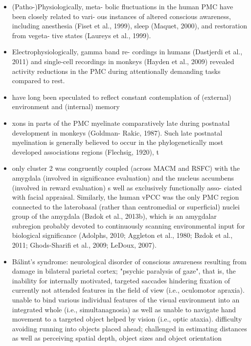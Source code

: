 \documentclass{article} %
\begin{document}
\begin{itemize}
\begin{itemize}
\item
(Patho-)Physiologically, meta- bolic fluctuations in the human PMC have been closely related to vari- ous instances of altered conscious awareness, including anesthesia (Fiset et al., 1999), sleep (Maquet, 2000), and restoration from vegeta- tive states (Laureys et al., 1999).

  \item
Electrophysiologically, gamma band re- cordings in humans (Dastjerdi et al., 2011) and single-cell recordings in monkeys (Hayden et al., 2009) revealed activity reductions in the PMC during attentionally demanding tasks compared to rest.

\item
 have long been speculated to reflect constant contemplation of (external) environment and (internal) memory

 \item
   xons in parts of the PMC myelinate comparatively late during postnatal development in monkeys (Goldman- Rakic, 1987). Such late postnatal myelination is generally believed to occur in the phylogenetically most developed associations regions (Flechsig, 1920), t

\item
only cluster 2 was congruently coupled (across MACM and RSFC) with the amygdala (involved in significance evaluation) and the nucleus accumbens (involved in reward evaluation)
s well as exclusively functionally asso- ciated with facial appraisal. Similarly, the human vPCC was the only PMC region connected to the laterobasal (rather than centromedial or superficial) nuclei group of the amygdala (Bzdok et al., 2013b), which is an amygdalar subregion probably devoted to continuously scanning environmental input for biological significance (Adolphs, 2010; Aggleton et al., 1980; Bzdok et al., 2011; Ghods-Sharifi et al., 2009; LeDoux, 2007).

\item Bálint's syndrome: neurological disorder of conscious
awareness resulting from damage in bilateral parietal cortex;
"psychic paralysis of gaze", that is, the inability for internally
motivated, targeted saccades hindering fixation of currently not
attended features in the field of view (i.e., oculomotor apraxia).
unable to bind various individual features of the visual
environment into an integrated whole (i.e., simultanagnosia)
as well as unable to navigate hand movement to a targeted
object helped by vision (i.e., optic ataxia).
difficulty avoiding running into objects placed ahead;
challenged in estimating distances as well as perceiving
spatial depth, object sizes and object orientation



\end{itemize}
\end{itemize}
\end{document}
